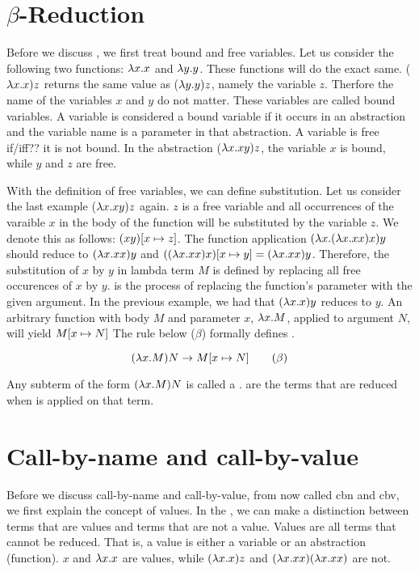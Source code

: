 \section{\texorpdfstring{\boldmath${\beta}$-Reduction}{Beta Reduction}}
Before we discuss \br, we first treat bound and free variables. Let us consider the following two functions: $\lambda x. x$ and $\lambda y. y$. These functions will do the exact same.
($\lambda x. x) z$ returns the same value as ($\lambda y.y) z$, namely the variable $z$. Therfore the name of the variables $x$ and $y$ do not matter. These variables are called bound variables.
A variable is considered a bound variable if it occurs in an abstraction and the variable name is a parameter in that abstraction. A variable is free if/iff?? it is not bound.
In the abstraction ($\lambda x. xy) z$, the variable $x$ is bound, while $y$ and $z$ are free.

With the definition of free variables, we can define substitution. Let us consider the last example ($\lambda x. xy) z$ again. $z$ is a free variable and all occurrences of the varaible $x$ in the body of the function will be substituted by the variable $z$.
We denote this as follows: $(xy) [{x}\mapsto{z}]$. The function application $(\lambda x. (\lambda x. x x) x)y$ should reduce to $(\lambda x. x x) y$ and $((\lambda x. x x) x) [{x}\mapsto{y}] = (\lambda x. x x) y$.
Therefore, the substitution of $x$ by $y$ in lambda term $M$ is defined by replacing all free occurences of $x$ by $y$.
\br is the process of replacing the function's parameter with the given argument. In the previous example, we had that $(\lambda x. x)y$ reduces to $y$.
An arbitrary function with body $M$ and parameter $x$, $\lambda x. M$, applied to argument $N$, will yield $M [{x}\mapsto{N}]$
The rule below ($\beta$) formally defines \br.

\vspace{10pt}
\[
	(\lambda x. M)N \rightarrow M [{x}\mapsto{N}] \quad \quad (\beta)
\]

\vspace{10pt}
Any subterm of the form $(\lambda x. M) N$ is called a \bre. \bres are the terms that are reduced when \br is applied on that term.

\section{Call-by-name and call-by-value}
Before we discuss call-by-name and call-by-value, from now called cbn and cbv, we first explain the concept of values.
In the \lc, we can make a distinction between terms that are values and terms that are not a value.
Values are all terms that cannot be reduced. That is, a value is either a variable or an abstraction (function).
$x$ and $\lambda x. x$ are values, while $(\lambda x. x)z$ and $(\lambda x. xx) (\lambda x. xx)$ are not.

